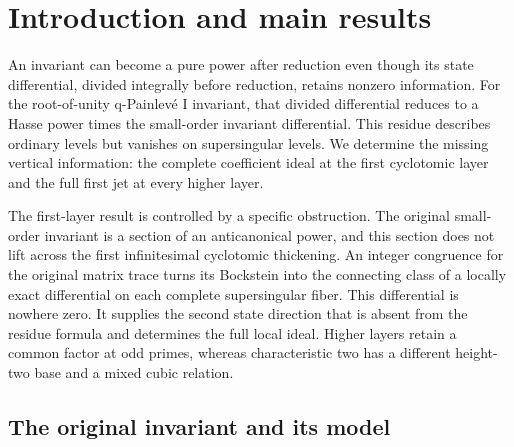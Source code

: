 \section{Introduction and main results}
\label{intro:section}

An invariant can become a pure power after reduction even though its
state differential, divided integrally before reduction, retains
nonzero information. For the root-of-unity q-Painlev\'e I invariant,
that divided differential reduces to a Hasse power times the
small-order invariant differential. This residue describes ordinary
levels but vanishes on supersingular levels. We determine the missing
vertical information: the complete coefficient ideal at the first
cyclotomic layer and the full first jet at every higher layer.

The first-layer result is controlled by a specific obstruction. The
original small-order invariant is a section of an anticanonical power,
and this section does not lift across the first infinitesimal
cyclotomic thickening. An integer congruence for the original matrix trace turns
its Bockstein into the connecting class of a locally exact differential
on each complete supersingular fiber. This differential is nowhere
zero. It supplies the second state direction that is absent from the
residue formula and determines the full local ideal. Higher layers
retain a common factor at odd primes, whereas characteristic two has
a different height-two base and a mixed cubic relation.

\subsection{The original invariant and its model}

